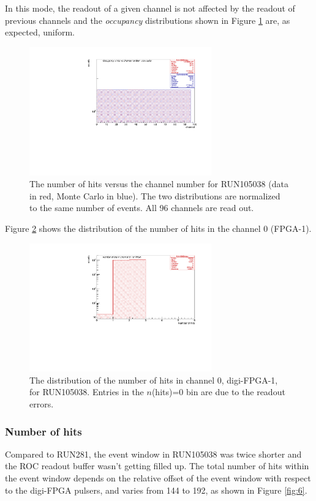 In this mode, the readout of a given channel is not affected by the readout of previous
channels and the \textit{occupancy} distributions shown in Figure \ref{fig:5} are, as expected, uniform.
\begin{figure}[!h]
\centering
\includegraphics[width =0.7\textwidth]{figures/pdf/figure_00002_nhitsvschannel_roc_simulation_2.pdf}
\caption{The number of hits versus the channel number for RUN105038 
(data in red, Monte Carlo in blue). The two distributions 
are normalized to the same number of events. All 96 channels are read out.}
\label{fig:5}
\end{figure}


Figure \ref{fig:67} shows the distribution of the number of hits in the channel 0 (FPGA-1).
\begin{figure}[!h]
\centering
\includegraphics[width =0.7\textwidth]{figures/pdf/figure_00067_nhits_ch00_run105038.pdf}
\caption{
  The distribution of the number of hits in channel 0, digi-FPGA-1, for RUN105038.
  Entries in the $n$(hits)=0 bin are due to the readout errors.
}
\label{fig:67}
\end{figure}

\subsubsection{Number of hits}
Compared to RUN281, the event window in RUN105038 was twice shorter
and the ROC readout buffer wasn't getting filled up.
The total number of hits within the event window depends on the relative offset
of the event window with respect to the digi-FPGA pulsers, and varies from
144 to 192, as shown in Figure \ref{fig:6}.

